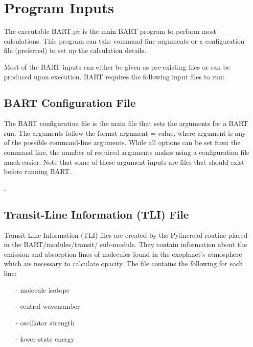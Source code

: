 \documentclass[letterpaper, 12pt]{article}
\begin{document}


\section{Program Inputs}
\label{sec:inputs}

The executable BART.py is the main BART program to perform most
calculations.  This program can take command-line arguments or a
configuration file (preferred) to set up the calculation details.

Most of the BART inputs can either be given as pre-existing files or
can be produced upon execution.
BART requires the following input files to run:


\subsection{BART Configuration File}
\label{sec:BARTconfig}
The BART configuration file is the main file that sets the arguments for a BART run. The arguments follow the format {\ttb argument = value}, where {\ttb argument} is any of the possible command-line arguments. While all options can be set from the command line, the number of required arguments makes using a configuration file much easier. Note that some of these argument inputs are files that should exist before running BART.

.

\subsection{Transit-Line Information (TLI) File}
\label{sec:TLI}
Transit Line-Information (TLI) files are created by the Pylineread routine placed in the BART/modules/transit/
sub-module. They contain information about the emission and absorption lines of molecules found in the exoplanet's atmosphere which ais necessary to calculate opacity. The file contains the following for each line:
\begin{enumerate}
\item[-]molecule isotope
\item[-]central wavenumber
\item[-]oscillator strength
\item[-]lower-state energy
\end{enumerate}
\end{document}
